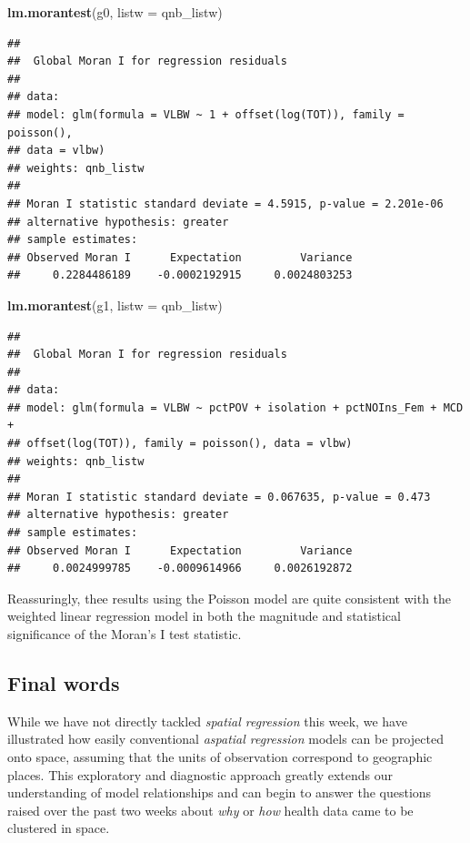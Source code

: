 \documentclass[
]{book}
\newenvironment{Shaded}{\begin{snugshade}}{\end{snugshade}}
\newcommand{\AttributeTok}[1]{\textcolor[rgb]{0.13,0.29,0.53}{#1}}
\newcommand{\FunctionTok}[1]{\textcolor[rgb]{0.13,0.29,0.53}{\textbf{#1}}}
\newcommand{\NormalTok}[1]{#1}
\begin{document}
\begin{Shaded}
\begin{Highlighting}[]
\FunctionTok{lm.morantest}\NormalTok{(g0, }\AttributeTok{listw =}\NormalTok{ qnb\_listw)}
\end{Highlighting}
\end{Shaded}

\begin{verbatim}
## 
##  Global Moran I for regression residuals
## 
## data:  
## model: glm(formula = VLBW ~ 1 + offset(log(TOT)), family = poisson(),
## data = vlbw)
## weights: qnb_listw
## 
## Moran I statistic standard deviate = 4.5915, p-value = 2.201e-06
## alternative hypothesis: greater
## sample estimates:
## Observed Moran I      Expectation         Variance 
##     0.2284486189    -0.0002192915     0.0024803253
\end{verbatim}

\begin{Shaded}
\begin{Highlighting}[]
\FunctionTok{lm.morantest}\NormalTok{(g1, }\AttributeTok{listw =}\NormalTok{ qnb\_listw)}
\end{Highlighting}
\end{Shaded}

\begin{verbatim}
## 
##  Global Moran I for regression residuals
## 
## data:  
## model: glm(formula = VLBW ~ pctPOV + isolation + pctNOIns_Fem + MCD +
## offset(log(TOT)), family = poisson(), data = vlbw)
## weights: qnb_listw
## 
## Moran I statistic standard deviate = 0.067635, p-value = 0.473
## alternative hypothesis: greater
## sample estimates:
## Observed Moran I      Expectation         Variance 
##     0.0024999785    -0.0009614966     0.0026192872
\end{verbatim}

Reassuringly, thee results using the Poisson model are quite consistent with the weighted linear regression model in both the magnitude and statistical significance of the Moran's I test statistic.

\hypertarget{final-words}{%
\subsection{Final words}\label{final-words}}

While we have not directly tackled \emph{spatial regression} this week, we have illustrated how easily conventional \emph{aspatial regression} models can be projected onto space, assuming that the units of observation correspond to geographic places. This exploratory and diagnostic approach greatly extends our understanding of model relationships and can begin to answer the questions raised over the past two weeks about \emph{why} or \emph{how} health data came to be clustered in space.
\end{document}
